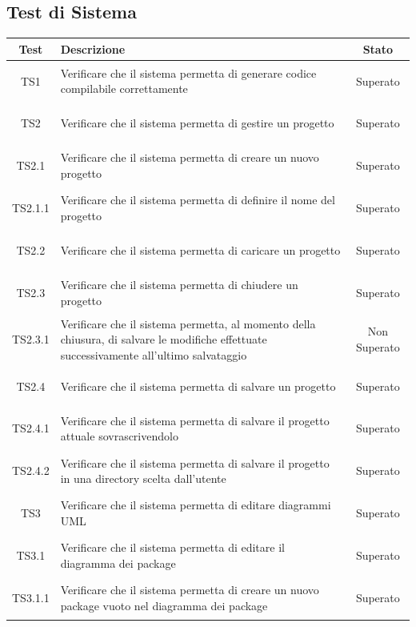 \documentclass[../PianoDiQualifica.tex]{subfiles}
\begin{document}
\newpage
\subsection{Test di Sistema}
\normalsize
\begin{longtable}{|c|>{\centering}p{10cm}|c|}
	\hline
	\textbf{Test} & \textbf{Descrizione} & \textbf{Stato}\\
	\hline
	\endhead
	
	\hypertarget{TS1}{TS1} & Verificare che il sistema permetta di generare codice compilabile correttamente & Superato \\
	\hline
	\hypertarget{TS2}{TS2} & Verificare che il sistema permetta di gestire un progetto & Superato \\
	\hline
	\hypertarget{TS2.1}{TS2.1} & Verificare che il sistema permetta di creare un nuovo progetto & Superato \\
	\hline
	\hypertarget{TS2.1.1}{TS2.1.1} & Verificare che il sistema permetta di definire il nome del progetto & Superato \\
	\hline
	\hypertarget{TS2.2}{TS2.2} & Verificare che il sistema permetta di caricare un progetto & Superato \\
	\hline
	\hypertarget{TS2.3}{TS2.3} & Verificare che il sistema permetta di chiudere un progetto & Superato \\
	\hline
	\hypertarget{TS2.3.1}{TS2.3.1} & Verificare che il sistema permetta, al momento della chiusura, di salvare le modifiche effettuate successivamente all'ultimo salvataggio & Non Superato \\
	\hline
	\hypertarget{TS2.4}{TS2.4} & Verificare che il sistema permetta di salvare un progetto & Superato \\
	\hline
	\hypertarget{TS2.4.1}{TS2.4.1} & Verificare che il sistema permetta di salvare il progetto attuale sovrascrivendolo & Superato \\
	\hline
	\hypertarget{TS2.4.2}{TS2.4.2} & Verificare che il sistema permetta di salvare il progetto in una directory scelta dall'utente & Superato \\
	\hline
	\hypertarget{TS3}{TS3} & Verificare che il sistema permetta di editare diagrammi UML & Superato \\
	\hline
	\hypertarget{TS3.1}{TS3.1} & Verificare che il sistema permetta di editare il diagramma dei package & Superato \\
	\hline
	\hypertarget{TS3.1.1}{TS3.1.1} & Verificare che il sistema permetta di creare un nuovo package vuoto nel diagramma dei package & Superato \\

\end{longtable}
\end{document}
